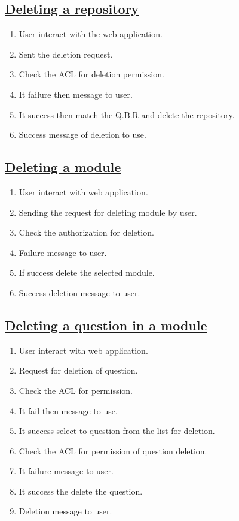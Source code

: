 \documentclass{article}
\begin{document}
\subsection*{\underline{Deleting a repository}}
\begin{enumerate}
\item User interact with the web application. 
\item Sent the deletion request. 
\item Check the ACL for deletion permission. 
\item It failure then message to user. 
\item It success then match the Q.B.R and delete the repository. 
\item Success message of deletion to use.
\begin{center}

\label{figure:deletingarep.latex}
\end{center}
\end{enumerate}
\subsection*{\underline{Deleting a module}}
\begin{enumerate}
\item User interact with web application. 
\item Sending the request for deleting module by user. 
\item Check the authorization for deletion. 
\item Failure message to user. 
\item If success delete the selected module. 
\item Success deletion message to user. 

\label{figure:deletingamodule.latex}
\end{enumerate}

\subsection*{\underline{Deleting a question in a module}}
\begin{enumerate}
\item User interact with web application. 
\item Request for deletion of question. 
\item Check the ACL for permission. 
\item It fail then message to use. 
\item It success select to question from the list for deletion. 
\item Check the ACL for permission of question deletion. 
\item It failure message to user. 
\item It success the delete the question. 
\item Deletion message to user. 
\begin{center}

\label{figure:Delete_Quiz.latex}
\end{center}
\end{enumerate}
\end{document}
